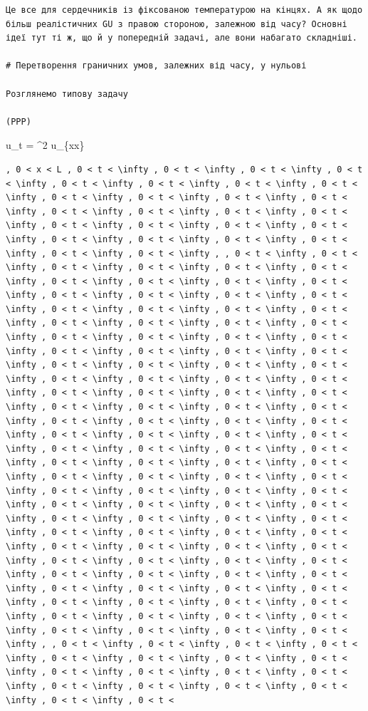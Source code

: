 \documentclass[
  ukrainian,
]{article}
\begin{document}
\begin{verbatim}
Це все для сердечників із фіксованою температурою на кінцях. А як щодо більш реалістичних GU з правою стороною, залежною від часу? Основні ідеї тут ті ж, що й у попередній задачі, але вони набагато складніші.

# Перетворення граничних умов, залежних від часу, у нульові

Розглянемо типову задачу

(PPP)
\end{verbatim}

u\_t = \alpha\^{}2 u\_\{xx\}

\begin{verbatim}
, 0 < x < L , 0 < t < \infty , 0 < t < \infty , 0 < t < \infty , 0 < t < \infty , 0 < t < \infty , 0 < t < \infty , 0 < t < \infty , 0 < t < \infty , 0 < t < \infty , 0 < t < \infty , 0 < t < \infty , 0 < t < \infty , 0 < t < \infty , 0 < t < \infty , 0 < t < \infty , 0 < t < \infty , 0 < t < \infty , 0 < t < \infty , 0 < t < \infty , 0 < t < \infty , 0 < t < \infty , 0 < t < \infty , 0 < t < \infty , 0 < t < \infty , 0 < t < \infty , 0 < t < \infty , , 0 < t < \infty , 0 < t < \infty , 0 < t < \infty , 0 < t < \infty , 0 < t < \infty , 0 < t < \infty , 0 < t < \infty , 0 < t < \infty , 0 < t < \infty , 0 < t < \infty , 0 < t < \infty , 0 < t < \infty , 0 < t < \infty , 0 < t < \infty , 0 < t < \infty , 0 < t < \infty , 0 < t < \infty , 0 < t < \infty , 0 < t < \infty , 0 < t < \infty , 0 < t < \infty , 0 < t < \infty , 0 < t < \infty , 0 < t < \infty , 0 < t < \infty , 0 < t < \infty , 0 < t < \infty , 0 < t < \infty , 0 < t < \infty , 0 < t < \infty , 0 < t < \infty , 0 < t < \infty , 0 < t < \infty , 0 < t < \infty , 0 < t < \infty , 0 < t < \infty , 0 < t < \infty , 0 < t < \infty , 0 < t < \infty , 0 < t < \infty , 0 < t < \infty , 0 < t < \infty , 0 < t < \infty , 0 < t < \infty , 0 < t < \infty , 0 < t < \infty , 0 < t < \infty , 0 < t < \infty , 0 < t < \infty , 0 < t < \infty , 0 < t < \infty , 0 < t < \infty , 0 < t < \infty , 0 < t < \infty , 0 < t < \infty , 0 < t < \infty , 0 < t < \infty , 0 < t < \infty , 0 < t < \infty , 0 < t < \infty , 0 < t < \infty , 0 < t < \infty , 0 < t < \infty , 0 < t < \infty , 0 < t < \infty , 0 < t < \infty , 0 < t < \infty , 0 < t < \infty , 0 < t < \infty , 0 < t < \infty , 0 < t < \infty , 0 < t < \infty , 0 < t < \infty , 0 < t < \infty , 0 < t < \infty , 0 < t < \infty , 0 < t < \infty , 0 < t < \infty , 0 < t < \infty , 0 < t < \infty , 0 < t < \infty , 0 < t < \infty , 0 < t < \infty , 0 < t < \infty , 0 < t < \infty , 0 < t < \infty , 0 < t < \infty , 0 < t < \infty , 0 < t < \infty , 0 < t < \infty , 0 < t < \infty , 0 < t < \infty , 0 < t < \infty , 0 < t < \infty , 0 < t < \infty , 0 < t < \infty , 0 < t < \infty , 0 < t < \infty , 0 < t < \infty , 0 < t < \infty , 0 < t < \infty , 0 < t < \infty , 0 < t < \infty , 0 < t < \infty , 0 < t < \infty , 0 < t < \infty , 0 < t < \infty , 0 < t < \infty , 0 < t < \infty , 0 < t < \infty , , 0 < t < \infty , 0 < t < \infty , 0 < t < \infty , 0 < t < \infty , 0 < t < \infty , 0 < t < \infty , 0 < t < \infty , 0 < t < \infty , 0 < t < \infty , 0 < t < \infty , 0 < t < \infty , 0 < t < \infty , 0 < t < \infty , 0 < t < \infty , 0 < t < \infty , 0 < t < \infty , 0 < t < \infty , 0 < t < 
\end{verbatim}
\end{document}
